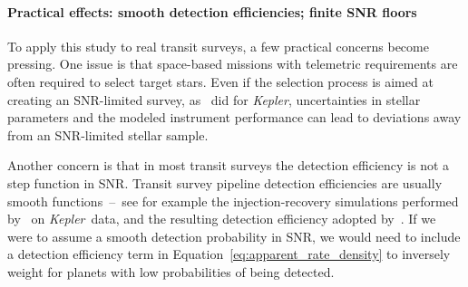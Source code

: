 \documentclass[12pt,modern]{aastex61}
\begin{document}

\paragraph{Practical effects: smooth detection efficiencies; finite SNR floors}
To apply this study to real transit surveys, a few practical concerns become 
pressing.
One issue is that space-based missions with telemetric requirements
are often required to select target stars.
Even if the selection process is aimed at creating an SNR-limited
survey, as~\citet{batalha_selection_2010} did for {\it Kepler},
uncertainties in stellar parameters and the modeled instrument performance
can lead to deviations away from an SNR-limited stellar sample.

Another concern is that in most transit surveys the detection efficiency is not
a step function in SNR.
Transit survey pipeline detection efficiencies are usually smooth
functions~--~see for example the injection-recovery 
simulations 
performed by~\citet{christiansen_measuring_2016} on {\it Kepler}\ data, 
and the resulting detection efficiency adopted 
by~\citet{fulton_california-_2017}.
If we were to assume a smooth detection probability in SNR, we would need to 
include a detection efficiency term in 
Equation~\ref{eq:apparent_rate_density} to inversely weight for planets 
with low probabilities of being detected.
\end{document}
